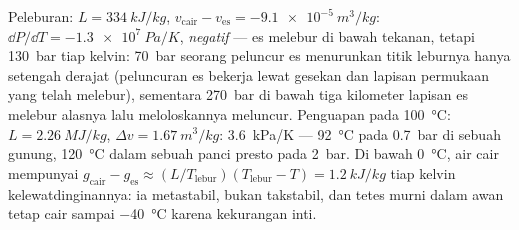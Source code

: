 \begin{example}\label{ex:b2:thermodynamic-potentials:water}
Peleburan: $L = \qty{334}{kJ/kg}$, $v_{\text{cair}} - v_{\text{es}} = -\qty{9.1e-5}{m^3/kg}$:
$\dd P/\dd T = \qty{-1.3e7}{Pa/K}$, \emph{negatif} --- es melebur di bawah
tekanan, tetapi \qty{130}{bar} tiap kelvin: \qty{70}{bar} seorang peluncur es menurunkan
titik leburnya hanya setengah derajat (peluncuran es bekerja lewat gesekan dan
lapisan permukaan yang telah melebur), sementara \qty{270}{bar} di bawah tiga
kilometer lapisan es melebur alasnya lalu meloloskannya meluncur. Penguapan pada
\qty{100}{\celsius}: $L = \qty{2.26}{MJ/kg}$, $\Delta v = \qty{1.67}{m^3/kg}$:
\qty{3.6}{kPa/K} --- \qty{92}{\celsius} pada \qty{0.7}{bar} di sebuah gunung,
\qty{120}{\celsius} dalam sebuah panci presto pada \qty{2}{bar}. Di bawah
\qty{0}{\celsius}, air cair mempunyai $g_{\text{cair}} - g_{\text{es}} \approx
(L/T_{\text{lebur}})(T_{\text{lebur}} - T) = \qty{1.2}{kJ/kg}$ tiap kelvin
kelewatdinginannya: ia metastabil, bukan takstabil, dan tetes murni dalam
awan tetap cair sampai \qty{-40}{\celsius} karena kekurangan inti.
\end{example}

